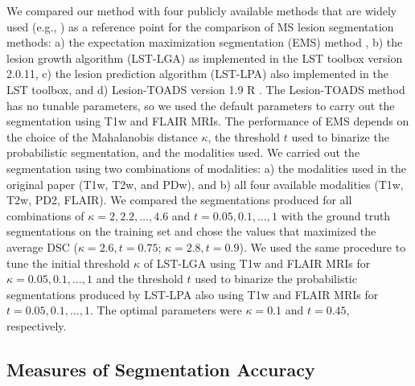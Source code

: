 We compared our method with four publicly available methods that are widely used
(e.g., \cite{sudre2015,subbanna2015,guizard2015}) as a reference point for the
comparison of MS lesion segmentation methods:
a) the expectation maximization segmentation (EMS) method \cite{vanleemput2001},
b) the lesion growth algorithm (LST-LGA) \cite{schmidt2012automated} as
implemented in the LST toolbox version 2.0.11, c) the lesion prediction
algorithm (LST-LPA) also implemented in the LST toolbox, and d) Lesion-TOADS
version 1.9 R \cite{shiee2010topology}. The Lesion-TOADS method has no tunable
parameters, so we used the default parameters to carry out the segmentation
using T1w and FLAIR MRIs. The performance of EMS depends on the choice of the
Mahalanobis distance $\kappa$, the threshold $t$ used to binarize the
probabilistic segmentation, and the modalities used. We carried out the
segmentation using two combinations of modalities: a) the modalities used in the
original paper \cite{vanleemput2001} (T1w, T2w, and PDw), and b) all four
available modalities (T1w, T2w, PD2, FLAIR). We compared the segmentations
produced for all combinations of $\kappa = 2, 2.2, \dotsc, 4.6$ and $t = 0.05,
0.1, \dotsc, 1$ with the ground truth segmentations on the training set and
chose the values that maximized the average DSC ($\kappa = 2.6, t = 0.75$;
$\kappa = 2.8, t = 0.9$). We used the same procedure to tune the initial
threshold $\kappa$ of LST-LGA using T1w and FLAIR MRIs for $\kappa = 0.05, 0.1,
\dotsc, 1$ and the threshold $t$ used to binarize the probabilistic
segmentations produced by LST-LPA also using T1w and FLAIR MRIs for $t = 0.05,
0.1, \dotsc, 1$. The optimal parameters were $\kappa = 0.1$ and $t = 0.45$,
respectively.

\subsection{Measures of Segmentation Accuracy}


